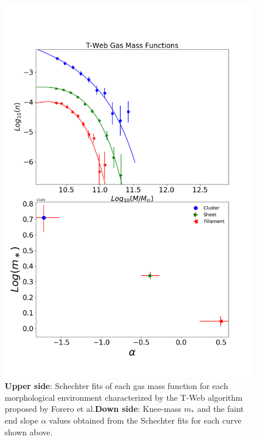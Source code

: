 \documentclass[a4paper,fleqn,usenatbib]{mnras}
\begin{document}
\begin{figure}
	\includegraphics[width=\columnwidth]{./pics/F19_T-Web_Gas.png}
    \caption{\textbf{Upper side}: Schechter fits of each gas mass
      function for each morphological environment characterized by the
      T-Web algorithm proposed by Forero et al.\textbf{Down side}:
      Knee-mass $m_\ast$ and the faint end slope $\alpha$ values
      obtained from the Schechter fits for each curve shown above.} 
    \label{fig:TwebGas}
\end{figure}
\end{document}
